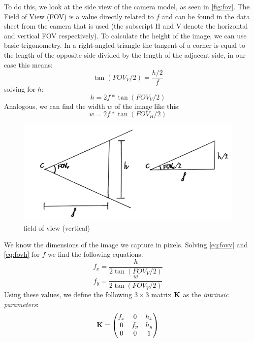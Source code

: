 To do this, we look at the side view of the camera model, as seen in \autoref{fig:fov}. The Field of View (FOV) is a value directly related to $f$ and can be found in the data sheet from the camera that is used (the subscript H and V denote the horizontal and vertical FOV respectively). To calculate the height of the image, we can use basic trigonometry. In a right-angled triangle the tangent of a corner is equal to the length of the opposite side divided by the length of the adjacent side, in our case this means:
\begin{equation}
    \tan(FOV_V/2) = \frac{h/2}{f}
\end{equation}\label{eq:fovv}
solving for $h$:
\begin{equation}
    h = 2f*\tan(FOV_V/2)
\end{equation}
Analogous, we can find the width $w$ of the image like this:
\begin{equation}\label{eq:fovh}
    w = 2f*\tan(FOV_H/2)
\end{equation}
\begin{figure}
    \centering
    \includegraphics[width=1\textwidth]{figures/field_of_view.jpg}
    \caption{field of view (vertical)}
    \label{fig:fov}
\end{figure}
We know the dimensions of the image we capture in pixels. Solving \autoref{eq:fovv} and \autoref{eq:fovh} for $f$ we find the following equations:
\begin{equation}
    f_x = \frac{h}{2\tan(FOV_V/2)}
\end{equation}
\begin{equation}
    f_y = \frac{w}{2\tan(FOV_V/2)}
\end{equation}
Using these values, we define the following $3\times3$ matrix $\mathbf{K}$ as the \textit{intrinsic parameters}:
\begin{equation}
    \mathbf{K} = \begin{pmatrix}
        f_x & 0 & h_x \\
        0 & f_y & h_y \\
        0 & 0 & 1
    \end{pmatrix}
\end{equation}

